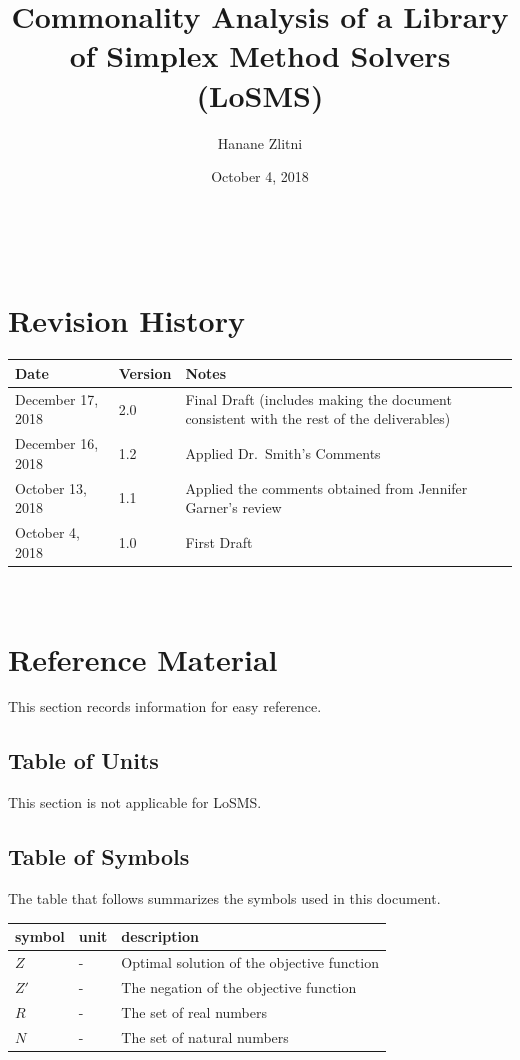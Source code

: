 \documentclass[12pt]{article}
\newcommand{\famname}{LoSMS} %
\begin{document}
\title{Commonality Analysis of a Library of Simplex Method Solvers (\famname{}) 
} 
\author{Hanane Zlitni}
\date{October 4, 2018}

\maketitle

~\newpage


\section{Revision History}

\begin{tabularx}{\textwidth}{p{3cm}p{2cm}X}
	\toprule {\bf Date} & {\bf Version} & {\bf Notes}\\
	\midrule
	December 17, 2018 & 2.0 & Final Draft (includes making the document 
	consistent with the rest of the deliverables)\\
	December 16, 2018 & 1.2 & Applied Dr.~Smith’s Comments\\
	October 13, 2018 & 1.1 & Applied the comments obtained from Jennifer 
	Garner's review\\
	October 4, 2018 & 1.0 & First Draft\\
	\bottomrule
\end{tabularx}

~\newpage
	
\section{Reference Material}

This section records information for easy reference.

\subsection{Table of Units}

This section is not applicable for \famname{}.

\subsection{Table of Symbols}

The table that follows summarizes the symbols used in this document.

\renewcommand{\arraystretch}{1.2}
\noindent \begin{longtable*}{l l p{12cm}} \toprule
\textbf{symbol} & \textbf{unit} & \textbf{description}\\
\midrule 
	$Z$ & - & Optimal solution of the objective function\\
	$Z'$ & - & The negation of the objective function\\
	$R$ & - & The set of real numbers\\
	$N$ & - & The set of natural numbers\\
\bottomrule
\end{longtable*}
\end{document}
